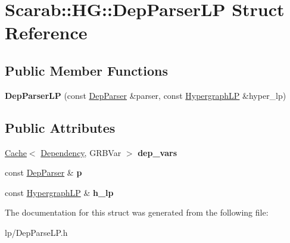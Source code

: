 \hypertarget{struct_scarab_1_1_h_g_1_1_dep_parser_l_p}{
\section{Scarab::HG::DepParserLP Struct Reference}
\label{struct_scarab_1_1_h_g_1_1_dep_parser_l_p}
}
\subsection*{Public Member Functions}
\begin{DoxyCompactItemize}
\item 
\hypertarget{struct_scarab_1_1_h_g_1_1_dep_parser_l_p_aaec1248e50de35594c4a20e89a782e95}{
{\bfseries DepParserLP} (const \hyperlink{class_dep_parser}{DepParser} \&parser, const \hyperlink{struct_scarab_1_1_h_g_1_1_hypergraph_l_p}{HypergraphLP} \&hyper\_\-lp)}
\label{struct_scarab_1_1_h_g_1_1_dep_parser_l_p_aaec1248e50de35594c4a20e89a782e95}

\end{DoxyCompactItemize}
\subsection*{Public Attributes}
\begin{DoxyCompactItemize}
\item 
\hypertarget{struct_scarab_1_1_h_g_1_1_dep_parser_l_p_af31e9d91e3407559cd2588bfef2296e3}{
\hyperlink{class_cache}{Cache}$<$ \hyperlink{struct_dependency}{Dependency}, GRBVar $>$ {\bfseries dep\_\-vars}}
\label{struct_scarab_1_1_h_g_1_1_dep_parser_l_p_af31e9d91e3407559cd2588bfef2296e3}

\item 
\hypertarget{struct_scarab_1_1_h_g_1_1_dep_parser_l_p_a93d0f269dabdd6fe83c68ee51baafb62}{
const \hyperlink{class_dep_parser}{DepParser} \& {\bfseries p}}
\label{struct_scarab_1_1_h_g_1_1_dep_parser_l_p_a93d0f269dabdd6fe83c68ee51baafb62}

\item 
\hypertarget{struct_scarab_1_1_h_g_1_1_dep_parser_l_p_acab7463a0d1349c5a1250ac0653c0569}{
const \hyperlink{struct_scarab_1_1_h_g_1_1_hypergraph_l_p}{HypergraphLP} \& {\bfseries h\_\-lp}}
\label{struct_scarab_1_1_h_g_1_1_dep_parser_l_p_acab7463a0d1349c5a1250ac0653c0569}

\end{DoxyCompactItemize}


The documentation for this struct was generated from the following file:\begin{DoxyCompactItemize}
\item 
lp/DepParseLP.h\end{DoxyCompactItemize}

